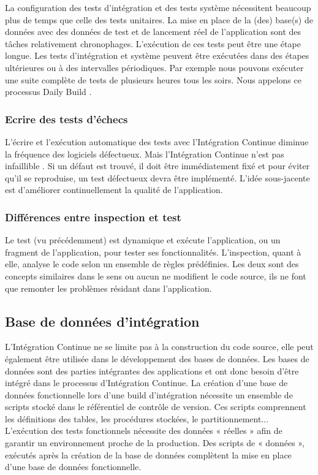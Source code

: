       La configuration des tests d'intégration et des tests système nécessitent beaucoup plus de temps que celle des tests unitaires. La mise en place de la (des) base(s) de données avec des données de test et de lancement réel de l’application sont des tâches relativement chronophages. L’exécution de ces tests peut être une étape longue. Les tests d’intégration et système peuvent être exécutées dans des étapes ultérieures ou à des intervalles périodiques. Par exemple nous pouvons exécuter une suite complète de tests de plusieurs heures tous les soirs. Nous appelons ce processus Daily Build \cite{McC96}.

      \subsubsection{Ecrire des tests d’échecs}
      L’écrire et l’exécution automatique des tests avec l’Intégration Continue diminue la fréquence des logiciels défectueux. Mais l’Intégration Continue n’est pas infaillible \cite{Duv07}. Si un défaut est trouvé, il doit être immédiatement fixé et pour éviter qu'il se reproduise, un test défectueux devra être implémenté. L'idée sous-jacente est d’améliorer continuellement la qualité de l’application.

      \subsubsection{Différences entre inspection et test}
      Le test (vu précédemment) est dynamique et exécute l’application, ou un fragment de l’application, pour tester ses fonctionnalités. L’inspection, quant à elle, analyse le code selon un ensemble de règles prédéfinies. Les deux sont des concepts similaires dans le sens ou aucun ne modifient le code source, ils ne font que remonter les problèmes résidant dans l’application.

    \subsection{Base de données d’intégration}
    L’Intégration Continue ne se limite pas à la construction du code source, elle peut également être utilisée dans le développement des bases de données. Les bases de données sont des parties intégrantes des applications et ont donc besoin d’être intégré dans le processus d’Intégration Continue. La création d’une base de données fonctionnelle lors d’une build d’intégration nécessite un ensemble de scripts stocké dans le référentiel de contrôle de version. Ces scripts comprennent les définitions des tables, les procédures stockées, le partitionnement... L’exécution des tests fonctionnels nécessite des données « réelles » afin de garantir un environnement proche de la production. Des scripts de « données », exécutés après la création de la base de données complètent la mise en place d’une base de données fonctionnelle.\\

